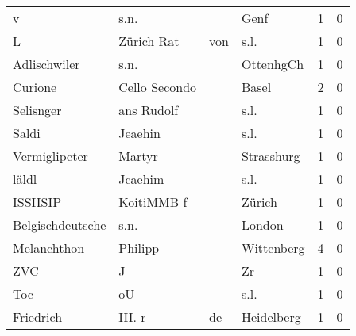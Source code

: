 \documentclass[10pt,a4paper,landscape]{article}
\begin{document}
\begin{longtable}{llllrr}
                        v &                               s.n. &             &                                        Genf &          1 &         0 \\
                        L &                         Zürich Rat &         von &                                        s.l. &          1 &         0 \\
             Adlischwiler &                               s.n. &             &                                   OttenhgCh &          1 &         0 \\
                  Curione &                      Cello Secondo &             &                                       Basel &          2 &         0 \\
                Selisnger &                         ans Rudolf &             &                                        s.l. &          1 &         0 \\
                    Saldi &                            Jeaehin &             &                                        s.l. &          1 &         0 \\
            Vermiglipeter &                             Martyr &             &                                  Strasshurg &          1 &         0 \\
                    läldl &                            Jcaehim &             &                                        s.l. &          1 &         0 \\
                 ISSIISIP &                         KoitiMMB f &             &                                      Zürich &          1 &         0 \\
         Belgischdeutsche &                               s.n. &             &                                      London &          1 &         0 \\
              Melanchthon &                            Philipp &             &                                  Wittenberg &          4 &         0 \\
                      ZVC &                                  J &             &                                          Zr &          1 &         0 \\
                      Toc &                                 oU &             &                                        s.l. &          1 &         0 \\
                Friedrich &                            III.  r &          de &                                  Heidelberg &          1 &         0 \\

\end{longtable}
\end{document}

